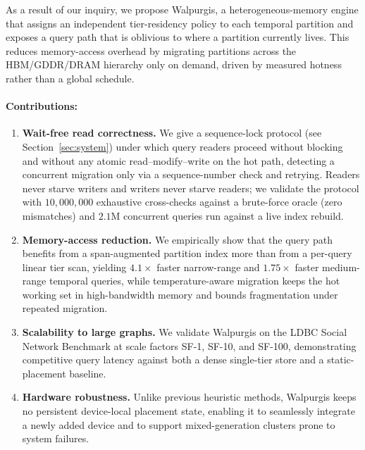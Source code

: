 \documentclass{article}
\begin{document}
As a result of our inquiry, we propose Walpurgis, a heterogeneous-memory engine
that assigns an independent tier-residency policy to each temporal partition and
exposes a query path that is oblivious to where a partition currently lives. This
reduces memory-access overhead by migrating partitions across the HBM/GDDR/DRAM
hierarchy only on demand, driven by measured hotness rather than a global schedule.

\paragraph{Contributions:}
\begin{enumerate}
    \item \textbf{Wait-free read correctness.} We give a sequence-lock protocol
    (see Section~\ref{sec:system}) under which query readers proceed without blocking
    and without any atomic read--modify--write on the hot path, detecting a concurrent
    migration only via a sequence-number check and retrying. Readers never starve
    writers and writers never starve readers; we validate the protocol with
    $10{,}000{,}000$ exhaustive cross-checks against a brute-force oracle (zero
    mismatches) and $2.1$M concurrent queries run against a live index rebuild.

    \item \textbf{Memory-access reduction.} We empirically show that the query path
    benefits from a span-augmented partition index more than from a per-query linear
    tier scan, yielding $4.1\times$ faster narrow-range and $1.75\times$ faster
    medium-range temporal queries, while temperature-aware migration keeps the hot
    working set in high-bandwidth memory and bounds fragmentation under repeated
    migration.

    \item \textbf{Scalability to large graphs.} We validate Walpurgis on the LDBC
    Social Network Benchmark at scale factors SF-1, SF-10, and SF-100, demonstrating
    competitive query latency against both a dense single-tier store and a
    static-placement baseline.

    \item \textbf{Hardware robustness.} Unlike previous heuristic methods,
    Walpurgis keeps no persistent device-local placement state, enabling it to
    seamlessly integrate a newly added device and to support mixed-generation clusters
    prone to system failures.
\end{enumerate}
\end{document}
